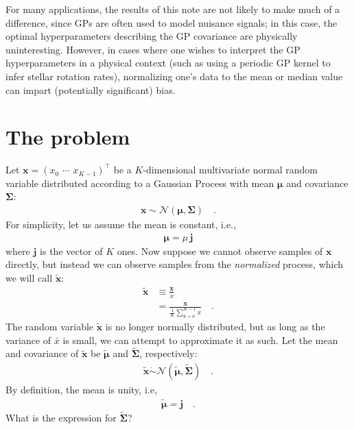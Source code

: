 \documentclass[modern]{aastex62}
\begin{document}
For many applications, the results of this note are not likely to make
much of a difference, since GPs are often used to model nuisance
signals; in this case, the optimal hyperparameters describing the GP
covariance are physically uninteresting. However, in cases where one
wishes to interpret the GP hyperparameters in a physical context
(such as using a periodic GP kernel to infer stellar rotation rates),
normalizing one's data to the mean or median value can impart
(potentially significant) bias.

\section{The problem}

Let $\mathbf{x} = \left( x_0 \,\, \cdots \,\, x_{K-1} \right)^\top$
be a $K$-dimensional multivariate normal random variable distributed
according to a Gaussian Process with mean $\pmb{\mu}$
and covariance $\pmb{\Sigma}$:
%
\begin{align}
    \mathbf{x} \sim \mathcal{N}\left( \pmb{\mu}, \pmb{\Sigma} \right)
    \quad.
\end{align}
%
For simplicity, let us assume the mean is constant, i.e.,
%
\begin{align}
    \pmb{\mu} = \mu \, \mathbf{j}
\end{align}
%
where $\mathbf{j}$ is the vector of $K$ ones.
%
Now suppose we cannot observe samples of $\mathbf{x}$ directly, but instead we can
observe samples from the \emph{normalized} process, which we will call
$\tilde{\mathbf{x}}$:
%
\begin{align}
    \tilde{\mathbf{x}}
     & \equiv \frac{\mathbf{x}}{\bar{x}}
    \nonumber                                                    \\[0.5em]
     & = \frac{\mathbf{x}}{\frac{1}{K}\sum\limits_{k=0}^{K-1} x}
    \quad.
\end{align}
%
The random variable $\tilde{\mathbf{x}}$ is no longer normally distributed, but as long as
the variance of $\bar{x}$ is small, we can attempt to approximate it as such. Let the mean
and covariance of $\tilde{\mathbf{x}}$ be $\tilde{\pmb{\mu}}$ and $\tilde{\pmb{\Sigma}}$, respectively:
%
\begin{align}
    \tilde{\mathbf{x}} \mathrel{\dot\sim} \mathcal{N}\left( \tilde{\pmb{\mu}}, \tilde{\pmb{\Sigma}} \right)
    \quad.
\end{align}
%
By definition, the mean is unity, i.e,
%
\begin{align}
    \tilde{\pmb{\mu}} = \mathbf{j}
    \quad.
\end{align}
%
What is the expression for $\tilde{\pmb{\Sigma}}$?
\end{document}

